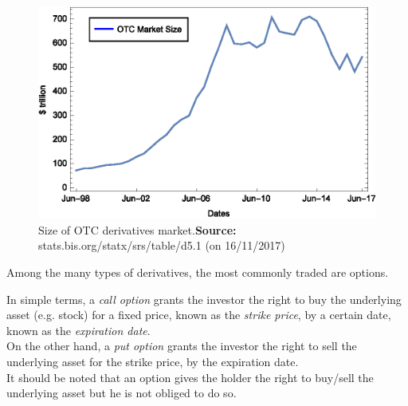 \documentclass[a4paper,prd,twocolumn,nofootinbib,superscriptaddress,floatfix]{revtex4}
\begin{document}
\begin{figure}[H]
    \centering
      \includegraphics[width=1.0\columnwidth]{OTC.eps}
      \caption{Size of OTC derivatives market.\newline \footnotesize{\textbf{Source:} stats.bis.org/statx/srs/table/d5.1 (on 16/11/2017)}}\label{fig:OTC}
    \end{figure}


Among the many types of derivatives, the most commonly traded are options.

In simple terms, a \textit{call option} grants the investor the right to buy the underlying asset (e.g. stock) for a fixed price, known as the \textit{strike price}, by a certain date, known as the \textit{expiration date}.\\
On the other hand, a \textit{put option} grants the investor the right to sell the underlying asset for the strike price, by the expiration date.\\
It should be noted that an option gives the holder the right to buy/sell the underlying asset but he is not obliged to do so.

\end{document}
